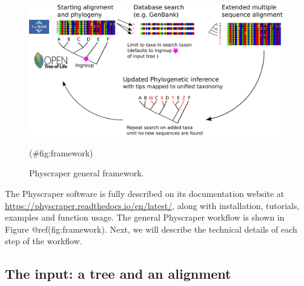 \documentclass[]{article}
\begin{document}
\begin{figure}

{\centering \includegraphics[width=0.85\linewidth]{docs/figs/schematic} 

}

\caption{Physcraper general framework.}(\#fig:framework)
\end{figure}

The Physcraper software is fully described on its documentation website at \url{https://physcraper.readthedocs.io/en/latest/}, along with installation, tutorials, examples and function usage.
The general Physcraper workflow is shown in Figure @ref(fig:framework). Next, we will describe the technical details of each step of the workflow.

\hypertarget{the-input-a-tree-and-an-alignment}{%
\subsection{The input: a tree and an alignment}\label{the-input-a-tree-and-an-alignment}}
\end{document}
